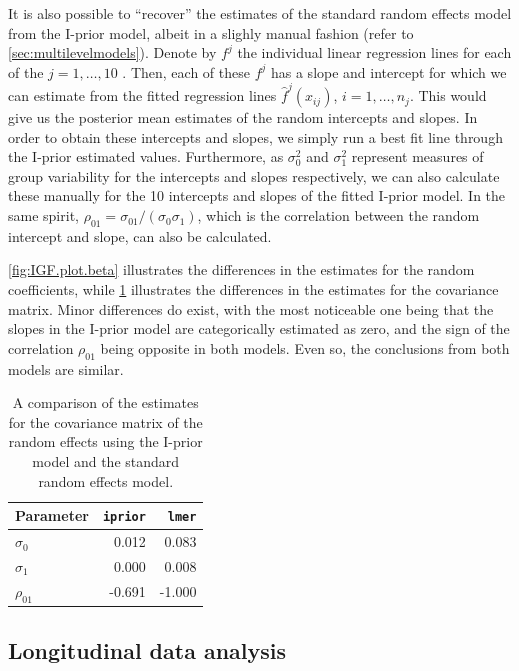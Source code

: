 \documentclass[showframe,11pt,twoside,openright]{report}\usepackage[]{graphicx}\usepackage{xcolor}
\begin{document}
It is also possible to ``recover'' the estimates of the standard random effects model from the I-prior model, albeit in a slighly manual fashion (refer to \cref{sec:multilevelmodels}).
Denote by $f^j$ the individual linear regression lines for each of the $j=1,\dots,10$ .
Then, each of these $f^j$ has a slope and intercept for which we can estimate from the fitted regression lines $\hat f^j(x_{ij})$, $i=1,\dots,n_j$.
This would give us the posterior mean estimates of the random intercepts and slopes.
In order to obtain these intercepts and slopes, we simply run a best fit line through the I-prior estimated  values.
Furthermore, as $\sigma_0^2$ and $\sigma_1^2$ represent measures of group variability for the intercepts and slopes respectively, we can also calculate these manually for the 10 intercepts and slopes of the fitted I-prior model.
In the same spirit, $\rho_{01} = \sigma_{01} / (\sigma_0 \sigma_1)$, which is the correlation between the random intercept and slope, can also be calculated.

\cref{fig:IGF.plot.beta} illustrates the differences in the estimates for the random coefficients, while  \cref{tab:igf} illustrates the differences in the estimates for the covariance matrix.
Minor differences do exist, with the most noticeable one being that the slopes in the I-prior model are categorically estimated as zero, and the sign of the correlation $\rho_{01}$ being opposite in both models.
Even so, the conclusions from both models are similar.

\begin{table}[htb]
\centering
\caption[A comparison of the estimates for the IGF data set]{A comparison of the estimates for the covariance matrix of the random effects using the I-prior model and the standard random effects model.}
\label{tab:igf}
\begin{tabular}{lrr}
\toprule
Parameter     & \texttt{iprior} & \texttt{lmer} \\
\midrule
$\sigma_0$    & 0.012 & 0.083 \\
$\sigma_1$    & 0.000 & 0.008 \\
$\rho_{01}$   & -0.691& -1.000 \\
\bottomrule
\end{tabular}
\end{table}

\subsection{Longitudinal data analysis}
\label{sec:cows}
\end{document}
